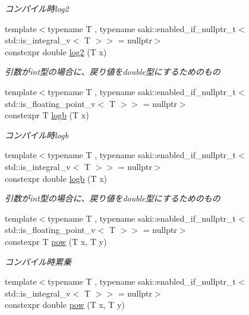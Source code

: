 \begin{DoxyCompactItemize}
\begin{DoxyCompactList}\small\item\em コンパイル時log2 \end{DoxyCompactList}\item 
{\footnotesize template$<$typename T , typename saki\+::enabled\+\_\+if\+\_\+nullptr\+\_\+t$<$ std\+::is\+\_\+integral\+\_\+v$<$ T $>$$>$  = nullptr$>$ }\\constexpr double \mbox{\hyperlink{namespacesaki_a8cb2f664389aab32abc797d9a60db4dc}{log2}} (T x)
\begin{DoxyCompactList}\small\item\em 引数がint型の場合に、戻り値をdouble型にするためのもの \end{DoxyCompactList}\item 
{\footnotesize template$<$typename T , typename saki\+::enabled\+\_\+if\+\_\+nullptr\+\_\+t$<$ std\+::is\+\_\+floating\+\_\+point\+\_\+v$<$ T $>$$>$  = nullptr$>$ }\\constexpr T \mbox{\hyperlink{namespacesaki_ab7e81af48b13fbf88f135d296471bac1}{logb}} (T x)
\begin{DoxyCompactList}\small\item\em コンパイル時logb \end{DoxyCompactList}\item 
{\footnotesize template$<$typename T , typename saki\+::enabled\+\_\+if\+\_\+nullptr\+\_\+t$<$ std\+::is\+\_\+integral\+\_\+v$<$ T $>$$>$  = nullptr$>$ }\\constexpr double \mbox{\hyperlink{namespacesaki_adf4ba562bb9897e98b75eb95027bfad5}{logb}} (T x)
\begin{DoxyCompactList}\small\item\em 引数がint型の場合に、戻り値をdouble型にするためのもの \end{DoxyCompactList}\item 
{\footnotesize template$<$typename T , typename saki\+::enabled\+\_\+if\+\_\+nullptr\+\_\+t$<$ std\+::is\+\_\+floating\+\_\+point\+\_\+v$<$ T $>$$>$  = nullptr$>$ }\\constexpr T \mbox{\hyperlink{namespacesaki_aa5b66f18d7c8c94b4c50731449ed3240}{pow}} (T x, T y)
\begin{DoxyCompactList}\small\item\em コンパイル時累乗 \end{DoxyCompactList}\item 
{\footnotesize template$<$typename T , typename saki\+::enabled\+\_\+if\+\_\+nullptr\+\_\+t$<$ std\+::is\+\_\+integral\+\_\+v$<$ T $>$$>$  = nullptr$>$ }\\constexpr double \mbox{\hyperlink{namespacesaki_a53b0e93733e85d7c6ab17aea25072536}{pow}} (T x, T y)

\end{DoxyCompactItemize}
